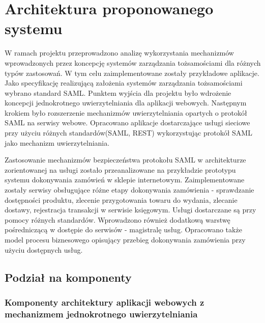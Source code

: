 \chapter{Architektura proponowanego systemu}
\label{cha:architektura}


W ramach projektu przeprowadzono analizę wykorzystania mechanizmów wprowadzonych przez koncepcję systemów zarządzania tożsamościami dla różnych typów zastosowań. W tym celu zaimplementowane zostały przykładowe aplikacje. Jako specyfikację realizującą założenia systemów zarządzania tożsamościami wybrano standard SAML. Punktem wyjścia dla projektu było wdrożenie koncepcji jednokrotnego uwierzytelniania dla aplikacji webowych. Następnym krokiem było rozszerzenie mechanizmów uwierzytelniania opartych o protokół SAML na serwisy webowe. Opracowano aplikacje dostarczające usługi sieciowe przy użyciu różnych standardów(SAML, REST) wykorzystując protokół SAML jako mechanizm uwierzytelniania. 

Zastosowanie mechanizmów bezpieczeństwa protokołu SAML w architekturze zorientowanej na usługi zostało przeanalizowane na przykładzie prototypu systemu dokonywania zamówień w sklepie internetowym. Zaimplementowane zostały serwisy obsługujące różne etapy dokonywania zamówienia - sprawdzanie dostępności produktu, zlecenie przygotowania towaru do wydania, zlecanie dostawy, rejestracja transakcji w serwisie księgowym. Usługi dostarczane są przy pomocy różnych standardów. Wprowadzono również dodatkową warstwę pośredniczącą w dostępie do serwisów - magistralę usług. Opracowano także model procesu biznesowego opisujący przebieg dokonywania zamówienia przy użyciu dostępnych usług. 

\section{Podział na komponenty}
\label{sec:komponenty}

	\subsection{Komponenty architektury aplikacji webowych z mechanizmem jednokrotnego uwierzytelniania}

